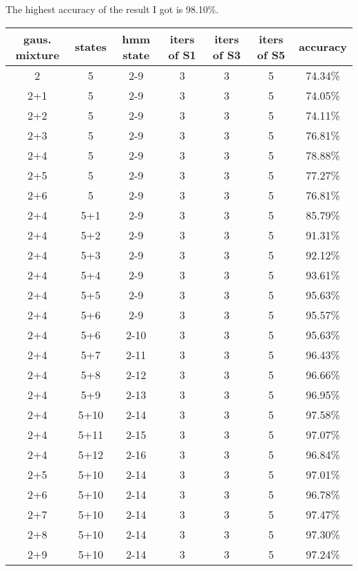 \documentclass[12pt,a4paper]{extarticle}
\begin{document}
The highest accuracy of the result I got is 98.10\%.

\begin{center}
  \begin{tabular}{| c | c | c | c | c | c || c |}
  \hline
  gaus. mixture & states & hmm state & iters of S1 & iters of S3 & iters of S5 & accuracy \\ \hline
  2 & 5 & 2-9 & 3 & 3 & 5 & 74.34\% \\ \hline
  2+1 & 5 & 2-9 & 3 & 3 & 5 & 74.05\% \\ \hline
  2+2 & 5 & 2-9 & 3 & 3 & 5 & 74.11\% \\ \hline
  2+3 & 5 & 2-9 & 3 & 3 & 5 & 76.81\% \\ \hline
  2+4 & 5 & 2-9 & 3 & 3 & 5 & 78.88\% \\ \hline
  2+5 & 5 & 2-9 & 3 & 3 & 5 & 77.27\% \\ \hline
  2+6 & 5 & 2-9 & 3 & 3 & 5 & 76.81\% \\ \hline
  2+4 & 5+1 & 2-9 & 3 & 3 & 5 & 85.79\% \\ \hline
  2+4 & 5+2 & 2-9 & 3 & 3 & 5 & 91.31\% \\ \hline
  2+4 & 5+3 & 2-9 & 3 & 3 & 5 & 92.12\% \\ \hline
  2+4 & 5+4 & 2-9 & 3 & 3 & 5 & 93.61\% \\ \hline
  2+4 & 5+5 & 2-9 & 3 & 3 & 5 & 95.63\% \\ \hline
  2+4 & 5+6 & 2-9 & 3 & 3 & 5 & 95.57\% \\ \hline
  2+4 & 5+6 & 2-10 & 3 & 3 & 5 & 95.63\% \\ \hline
  2+4 & 5+7 & 2-11 & 3 & 3 & 5 & 96.43\% \\ \hline
  2+4 & 5+8 & 2-12 & 3 & 3 & 5 & 96.66\% \\ \hline
  2+4 & 5+9 & 2-13 & 3 & 3 & 5 & 96.95\% \\ \hline
  2+4 & 5+10 & 2-14 & 3 & 3 & 5 & 97.58\% \\ \hline
  2+4 & 5+11 & 2-15 & 3 & 3 & 5 & 97.07\% \\ \hline
  2+4 & 5+12 & 2-16 & 3 & 3 & 5 & 96.84\% \\ \hline
  2+5 & 5+10 & 2-14 & 3 & 3 & 5 & 97.01\% \\ \hline
  2+6 & 5+10 & 2-14 & 3 & 3 & 5 & 96.78\% \\ \hline
  2+7 & 5+10 & 2-14 & 3 & 3 & 5 & 97.47\% \\ \hline
  2+8 & 5+10 & 2-14 & 3 & 3 & 5 & 97.30\% \\ \hline
  2+9 & 5+10 & 2-14 & 3 & 3 & 5 & 97.24\% \\ \hline

\end{tabular}
\end{center}
\end{document}
